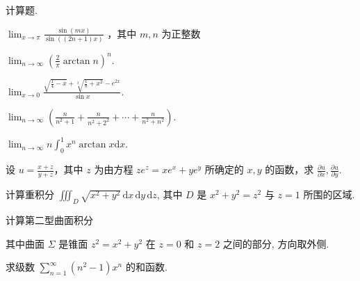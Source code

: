 \par{}
计算题.\par
$\lim_{x\to \pi}\frac{\sin(mx)}{\sin((2n + 1)x)}$ ，其中 $m,n$ 为正整数\par
$\lim_{n\to\infty}\left(\frac{2}{\pi}\arctan n\right)^{n}.$\par
$\lim_{x\to 0}\frac{\sqrt{\frac{1}{4} - x} + \sqrt[3]{\frac{1}{8} + x^2} - e^{2x}}{\sin x}.$\par
$\lim_{n\to\infty}\left(\frac{n}{n^{2}+1}+\frac{n}{n^{2}+2^{2}}+\cdots+\frac{n}{n^{2}+n^{2}}\right).$\par
$\lim_{n\to \infty}n\int_0^1 x^n\arctan x\mathrm{d}x.$\par
设 $u = \frac{x + z}{y + z}$，其中 $z$ 为由方程 $ze^z = xe^x + ye^y$ 所确定的 $x, y$ 的函数，求 $\frac{\partial u}{\partial x}, \frac{\partial u}{\partial y}$.\par
计算重积分 $\iiint_{D} \sqrt{x^2 + y^2} \, \mathrm{d}x \, \mathrm{d}y \, \mathrm{d}z$, 其中 $D$ 是 $x^2 + y^2 = z^2$ 与 $z = 1$ 所围的区域.\par
\par{}
计算第二型曲面积分\par
\nopagebreak[4]
其中曲面 $\Sigma$ 是锥面 $z^2 = x^2 + y^2$ 在 $z = 0$ 和 $z = 2$ 之间的部分, 方向取外侧.\par
\par{}
求级数 $\sum_{n=1}^{\infty}(n^{2}-1)x^{n}$ 的和函数.\par
